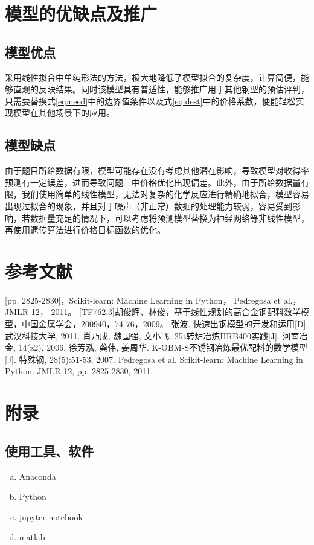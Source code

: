 \documentclass{xcumcmart}
\begin{document}
\section{模型的优缺点及推广}
\subsection{模型优点}
采用线性拟合中单纯形法的方法，极大地降低了模型拟合的复杂度，计算简便，能够直观的反映结果。同时该模型具有普适性，能够推广用于其他钢型的预估评判，只需要替换式\ref{eq:need}中的边界值条件以及式\ref{eq:dest}中的价格系数，便能轻松实现模型在其他场景下的应用。
\subsection{模型缺点}
由于题目所给数据有限，模型可能存在没有考虑其他潜在影响，导致模型对收得率预测有一定误差，进而导致问题三中价格优化出现偏差。此外，由于所给数据量有限，我们使用简单的线性模型，无法对复杂的化学反应进行精确地拟合，模型容易出现过拟合的现象，并且对于噪声（非正常）数据的处理能力较弱，容易受到影响，若数据量充足的情况下，可以考虑将预测模型替换为神经网络等非线性模型，再使用遗传算法进行价格目标函数的优化。
\section{参考文献}
\begin{thebibliography}{1}
 [pp. 2825-2830]，Scikit-learn: Machine Learning in Python， Pedregosa et al.， JMLR 12， 2011。
 [TF762.3]胡俊辉、林俊，基于线性规划的高合金钢配料数学模型，中国金属学会，200940，74-76，2009。
 张波. 快速出钢模型的开发和运用[D]. 武汉科技大学, 2011.
 肖乃成, 魏国强, 文小飞. 25t转炉冶炼HRB400实践[J]. 河南冶金, 14(z2), 2006.
 徐芳泓, 龚伟, 姜周华. K-OBM-S不锈钢冶炼最优配料的数学模型[J]. 特殊钢, 28(5):51-53, 2007.
 Pedregosa et al. Scikit-learn: Machine Learning in Python. JMLR 12, pp. 2825-2830, 2011.
\end{thebibliography}

\newpage
\section{附录}
\subsection{使用工具、软件}
\begin{enumerate}[(a)]
\item Anaconda
\item Python
\item jupyter notebook
\item matlab
\end{enumerate}
\end{document}
